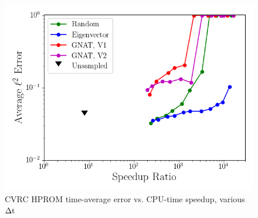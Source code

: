 \begin{figure}
	\centering
	\begin{minipage}{0.49\linewidth}
		\includegraphics[width=0.99\linewidth]{Chapters/HPROMResults/Images/cvrc/deim/sampled_dt1e-6_Average_errorRaw_pareto.png}
		\subcaption{$\dt = 10 \times \dtFOM$}
	\end{minipage}
	\caption{\label{fig:cvrcSampledROMErrVsTime}CVRC HPROM time-average error vs. CPU-time speedup, various $\Delta \text{t}$}
\end{figure}



